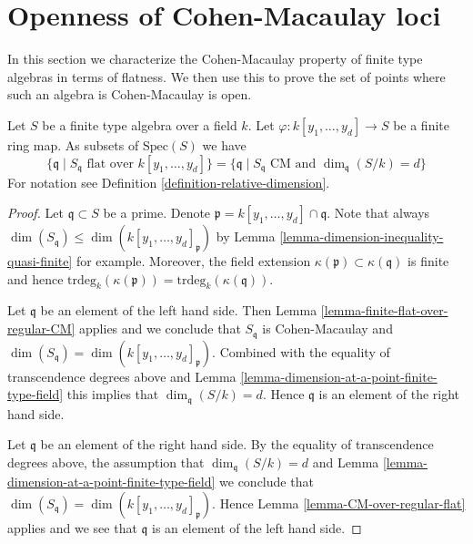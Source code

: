 \section{Openness of Cohen-Macaulay loci}
\label{section-CM-open}

\noindent
In this section we characterize the Cohen-Macaulay property
of finite type algebras in terms of flatness. We then use this
to prove the set of points where such an algebra is Cohen-Macaulay
is open.

\begin{lemma}
\label{lemma-where-CM}
Let $S$ be a finite type algebra over a field $k$.
Let $\varphi : k[y_1, \ldots, y_d] \to S$ be a finite ring map.
As subsets of $\text{Spec}(S)$ we have
$$
\{ \mathfrak q \mid
S_{\mathfrak q} \text{ flat over }k[y_1, \ldots, y_d]\}
=
\{ \mathfrak q \mid
S_{\mathfrak q} \text{ CM and }\dim_{\mathfrak q}(S/k) = d\}
$$
For notation see Definition \ref{definition-relative-dimension}.
\end{lemma}

\begin{proof}
Let $\mathfrak q \subset S$ be a prime. Denote
$\mathfrak p = k[y_1, \ldots, y_d] \cap \mathfrak q$.
Note that always
$\dim(S_{\mathfrak q}) \leq \dim(k[y_1, \ldots, y_d]_{\mathfrak p})$
by Lemma \ref{lemma-dimension-inequality-quasi-finite} for example.
Moreover, the field extension $\kappa(\mathfrak p) \subset \kappa(\mathfrak q)$
is finite and hence
$\text{trdeg}_k(\kappa(\mathfrak p)) = \text{trdeg}_k(\kappa(\mathfrak q))$.

\medskip\noindent
Let $\mathfrak q$ be an element of the left hand side.
Then Lemma \ref{lemma-finite-flat-over-regular-CM} applies
and we conclude that $S_{\mathfrak q}$ is Cohen-Macaulay
and $\dim(S_{\mathfrak q}) = \dim(k[y_1, \ldots, y_d]_{\mathfrak p})$.
Combined with the equality of transcendence degrees above and
Lemma \ref{lemma-dimension-at-a-point-finite-type-field} this
implies that $\dim_{\mathfrak q}(S/k) = d$. Hence $\mathfrak q$
is an element of the right hand side.

\medskip\noindent
Let $\mathfrak q$ be an element of the right hand side.
By the equality of transcendence degrees above, the assumption
that $\dim_{\mathfrak q}(S/k) = d$ and
Lemma \ref{lemma-dimension-at-a-point-finite-type-field}
we conclude that
$\dim(S_{\mathfrak q}) = \dim(k[y_1, \ldots, y_d]_{\mathfrak p})$.
Hence Lemma \ref{lemma-CM-over-regular-flat}
applies and we see that $\mathfrak q$ is an
element of the left hand side.
\end{proof}

